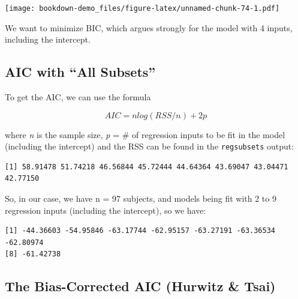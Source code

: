 \documentclass[]{book}
\newenvironment{Shaded}{\begin{snugshade}}{\end{snugshade}}
\newcommand{\KeywordTok}[1]{\textcolor[rgb]{0.13,0.29,0.53}{\textbf{#1}}}
\newcommand{\DecValTok}[1]{\textcolor[rgb]{0.00,0.00,0.81}{#1}}
\newcommand{\StringTok}[1]{\textcolor[rgb]{0.31,0.60,0.02}{#1}}
\newcommand{\OperatorTok}[1]{\textcolor[rgb]{0.81,0.36,0.00}{\textbf{#1}}}
\newcommand{\NormalTok}[1]{#1}
\theoremstyle{definition}
\theoremstyle{definition}
\theoremstyle{definition}
\theoremstyle{remark}
\begin{document}
\texttt{[image: bookdown-demo\_files/figure-latex/unnamed-chunk-74-1.pdf]}

We want to minimize BIC, which argues strongly for the model with 4
inputs, including the intercept.

\subsection{\texorpdfstring{AIC with ``All
Subsets''}{AIC with All Subsets}}\label{aic-with-all-subsets}

To get the AIC, we can use the formula

\[
AIC = n log(RSS/n) + 2p
\]

where \emph{n} is the sample size, \emph{p} = \# of regression inputs to
be fit in the model (including the intercept) and the RSS can be found
in the \texttt{regsubsets} output:

\begin{Shaded}
\end{Shaded}

\begin{verbatim}
[1] 58.91478 51.74218 46.56844 45.72444 44.64364 43.69047 43.04471 42.77150
\end{verbatim}

So, in our case, we have n = 97 subjects, and models being fit with 2 to
9 regression inputs (including the intercept), so we have:

\begin{Shaded}
\end{Shaded}

\begin{verbatim}
[1] -44.36603 -54.95846 -63.17744 -62.95157 -63.27191 -63.36534 -62.80974
[8] -61.42738
\end{verbatim}

\subsection{The Bias-Corrected AIC (Hurwitz \&
Tsai)}\label{the-bias-corrected-aic-hurwitz-tsai}
\end{document}
